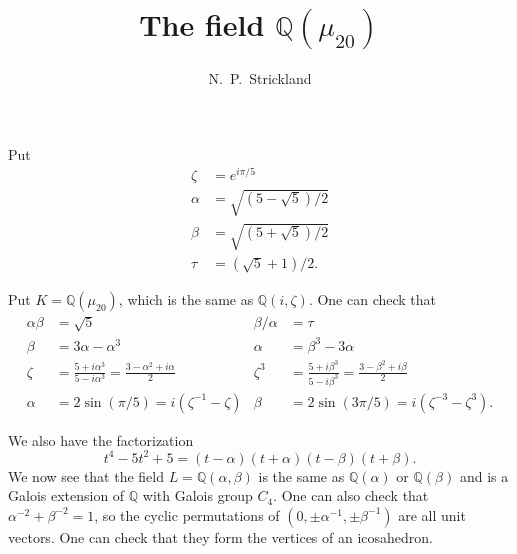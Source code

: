 \documentclass{amsart}
\newcommand{\Q}         {{\mathbb{Q}}}
\newcommand{\al}        {\alpha}
\newcommand{\bt}        {\beta}
\newcommand{\zt}        {\zeta}
\renewcommand{\:}{\colon}
\begin{document}
\title{The field $\Q(\mu_{20})$}
\author{N.~P.~Strickland}

\maketitle 

Put
\begin{align*}
 \zt &= e^{i\pi/5} \\
 \al &= \sqrt{(5 - \sqrt{5})/2} \\
 \bt &= \sqrt{(5 + \sqrt{5})/2} \\
 \tau &= (\sqrt{5}+1)/2.
\end{align*}

Put $K=\Q(\mu_{20})$, which is the same as $\Q(i,\zt)$.  One can check that
\begin{align*}
 \al \bt &= \sqrt{5} & \bt/\al &= \tau \\
 \bt &= 3\al - \al^3 & \al &= \bt^3 - 3\al \\
 \zt   &= \frac{5+i\al^3}{5-i\al^3} = \frac{3 - \al^2 + i\al}{2} & 
 \zt^3 &= \frac{5+i\bt^3}{5-i\bt^3} = \frac{3 - \bt^2 + i\bt}{2} \\
 \al &= 2\sin(\pi/5) = i(\zt^{-1}-\zt) &
 \bt &= 2\sin(3\pi/5) = i(\zt^{-3}-\zt^3).
\end{align*}

We also have the factorization
\[ t^4 - 5 t^2 + 5 = (t-\al)(t+\al)(t-\bt)(t+\bt). \]
We now see that the field $L=\Q(\al,\bt)$ is the same as $\Q(\al)$ or
$\Q(\bt)$ and is a Galois extension of $\Q$ with Galois group $C_4$.
One can also check that $\al^{-2}+\bt^{-2}=1$, so the cyclic
permutations of $(0,\pm\al^{-1},\pm\bt^{-1})$ are all unit vectors.
One can check that they form the vertices of an icosahedron.
\end{document}
